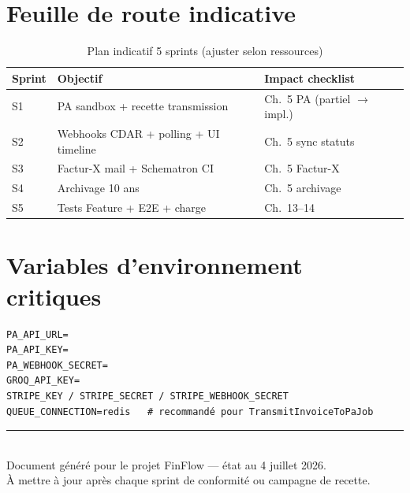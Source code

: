\documentclass[11pt,a4paper]{report}
\begin{document}
\section{Feuille de route indicative}

\begin{table}[htbp]
    \centering
    \renewcommand{\arraystretch}{1.25}
    \begin{tabular}{@{}C{1.2cm}L{5.5cm}L{7.5cm}@{}}
        \toprule
        \textbf{Sprint} & \textbf{Objectif} & \textbf{Impact checklist} \\
        \midrule
        S1 & PA sandbox + recette transmission & Ch.~5 PA (partiel $\rightarrow$ impl.) \\
        S2 & Webhooks CDAR + polling + UI timeline & Ch.~5 sync statuts \\
        S3 & Factur-X mail + Schematron CI & Ch.~5 Factur-X \\
        S4 & Archivage 10 ans & Ch.~5 archivage \\
        S5 & Tests Feature + E2E + charge & Ch.~13--14 \\
        \bottomrule
    \end{tabular}
    \caption{Plan indicatif 5 sprints (ajuster selon ressources)}
\end{table}

\section{Variables d'environnement critiques}

\begin{verbatim}
PA_API_URL=
PA_API_KEY=
PA_WEBHOOK_SECRET=
GROQ_API_KEY=
STRIPE_KEY / STRIPE_SECRET / STRIPE_WEBHOOK_SECRET
QUEUE_CONNECTION=redis   # recommandé pour TransmitInvoiceToPaJob
\end{verbatim}

\vfill
\noindent\rule{\textwidth}{0.4pt}\\[0.5em]
\small\textcolor{finflowgray}{Document généré pour le projet FinFlow — état au 4 juillet 2026.\\
À mettre à jour après chaque sprint de conformité ou campagne de recette.}
\end{document}
